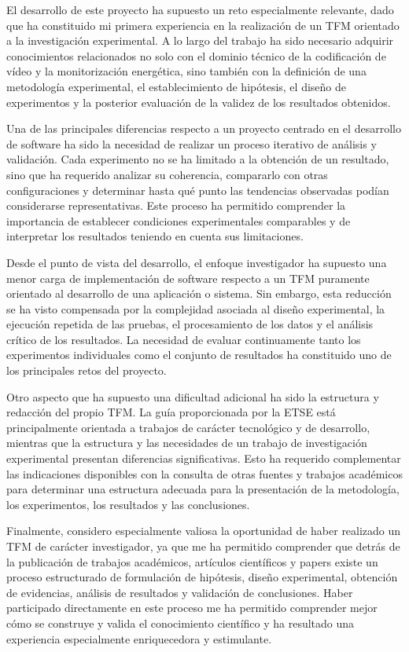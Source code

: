 El desarrollo de este proyecto ha supuesto un reto especialmente relevante, dado que ha constituido mi primera experiencia en la realización de un TFM orientado a la investigación experimental. A lo largo del trabajo ha sido necesario adquirir conocimientos relacionados no solo con el dominio técnico de la codificación de vídeo y la monitorización energética, sino también con la definición de una metodología experimental, el establecimiento de hipótesis, el diseño de experimentos y la posterior evaluación de la validez de los resultados obtenidos.

Una de las principales diferencias respecto a un proyecto centrado en el desarrollo de software ha sido la necesidad de realizar un proceso iterativo de análisis y validación. Cada experimento no se ha limitado a la obtención de un resultado, sino que ha requerido analizar su coherencia, compararlo con otras configuraciones y determinar hasta qué punto las tendencias observadas podían considerarse representativas. Este proceso ha permitido comprender la importancia de establecer condiciones experimentales comparables y de interpretar los resultados teniendo en cuenta sus limitaciones.

Desde el punto de vista del desarrollo, el enfoque investigador ha supuesto una menor carga de implementación de software respecto a un TFM puramente orientado al desarrollo de una aplicación o sistema. Sin embargo, esta reducción se ha visto compensada por la complejidad asociada al diseño experimental, la ejecución repetida de las pruebas, el procesamiento de los datos y el análisis crítico de los resultados. La necesidad de evaluar continuamente tanto los experimentos individuales como el conjunto de resultados ha constituido uno de los principales retos del proyecto.

Otro aspecto que ha supuesto una dificultad adicional ha sido la estructura y redacción del propio TFM. La guía proporcionada por la ETSE está principalmente orientada a trabajos de carácter tecnológico y de desarrollo, mientras que la estructura y las necesidades de un trabajo de investigación experimental presentan diferencias significativas. Esto ha requerido complementar las indicaciones disponibles con la consulta de otras fuentes y trabajos académicos para determinar una estructura adecuada para la presentación de la metodología, los experimentos, los resultados y las conclusiones.

Finalmente, considero especialmente valiosa la oportunidad de haber realizado un TFM de carácter investigador, ya que me ha permitido comprender que detrás de la publicación de trabajos académicos, artículos científicos y papers existe un proceso estructurado de formulación de hipótesis, diseño experimental, obtención de evidencias, análisis de resultados y validación de conclusiones. Haber participado directamente en este proceso me ha permitido comprender mejor cómo se construye y valida el conocimiento científico y ha resultado una experiencia especialmente enriquecedora y estimulante.